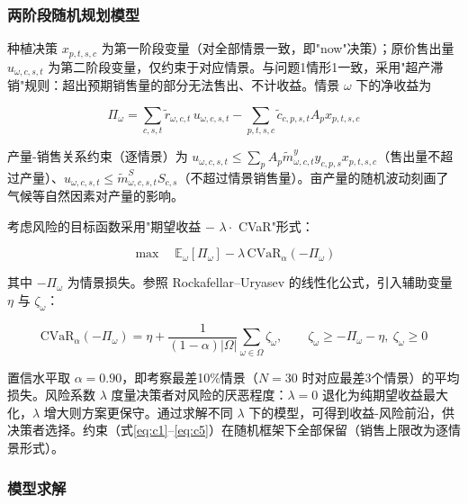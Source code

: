 \subsubsection{两阶段随机规划模型}

种植决策 $x_{p,t,s,c}$ 为第一阶段变量（对全部情景一致，即"now"决策）；原价售出量 $u_{\omega,c,s,t}$ 为第二阶段变量，仅约束于对应情景。与问题1情形1一致，采用"超产滞销"规则：超出预期销售量的部分无法售出、不计收益。情景 $\omega$ 下的净收益为

\begin{equation}
\Pi_\omega = \sum_{c,s,t} \tilde{r}_{\omega,c,t}\, u_{\omega,c,s,t} - \sum_{p,t,s,c} \tilde{c}_{c,p,s,t} A_p x_{p,t,s,c}
\label{eq:profit-scen}
\end{equation}

产量-销售关系约束（逐情景）为 $u_{\omega,c,s,t}\le \sum_p A_p \tilde{m}^y_{\omega,c,t} y_{c,p,s}x_{p,t,s,c}$（售出量不超过产量）、$u_{\omega,c,s,t}\le \tilde{m}^S_{\omega,c,s,t}S_{c,s}$（不超过情景销售量）。亩产量的随机波动刻画了气候等自然因素对产量的影响\cite{climate2009}。

考虑风险的目标函数采用"期望收益 $-$ $\lambda\cdot$ CVaR"形式：

\begin{equation}
\max\quad \mathbb{E}_\omega[\Pi_\omega] - \lambda\, \mathrm{CVaR}_\alpha(-\Pi_\omega)
\label{eq:obj3}
\end{equation}

其中 $-\Pi_\omega$ 为情景损失。参照 Rockafellar--Uryasev 的线性化公式\cite{cvar2000,cvar2002}，引入辅助变量 $\eta$ 与 $\zeta_\omega$：

\begin{equation}
\mathrm{CVaR}_\alpha(-\Pi_\omega) = \eta + \frac{1}{(1-\alpha)|\Omega|}\sum_{\omega\in\Omega}\zeta_\omega, \qquad
\zeta_\omega \ge -\Pi_\omega - \eta,\ \zeta_\omega\ge 0
\label{eq:cvar-linear}
\end{equation}

置信水平取 $\alpha=0.90$，即考察最差10\%情景（$N=30$ 时对应最差3个情景）的平均损失。风险系数 $\lambda$ 度量决策者对风险的厌恶程度：$\lambda=0$ 退化为纯期望收益最大化，$\lambda$ 增大则方案更保守。通过求解不同 $\lambda$ 下的模型，可得到收益-风险前沿，供决策者选择。约束（式\ref{eq:c1}--\ref{eq:c5}）在随机框架下全部保留（销售上限改为逐情景形式）。

\subsubsection{模型求解}


